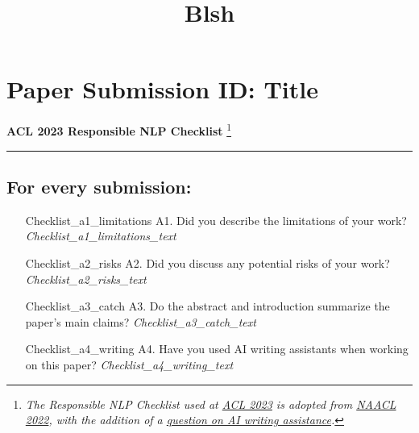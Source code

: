 \documentclass[11pt]{article}
\newcommand\blfootnote[1]{%
  \begingroup
  \renewcommand\thefootnote{}\footnote{#1}%
  \addtocounter{footnote}{-1}%
  \endgroup
}
\begin{document}
\appendix
\title{Blsh}
\section*{Paper {{Submission ID}}: {{Title}}}
\textbf{ACL 2023 Responsible NLP Checklist}
\blfootnote{\textit{The Responsible NLP Checklist used at \href{https://2023.aclweb.org/}{ACL 2023} is adopted from \href{https://2022.naacl.org/blog/responsible-nlp-research-checklist/}{NAACL 2022}, 
with the addition of a \href{https://2023.aclweb.org/blog/ACL-2023-policy/}{question on AI writing assistance}.}} 
\hrule

\renewcommand{\thesubsection}{\Alph{subsection}}

\subsection{For every submission:}
\begin{itemize}
    \item[{{Checklist_a1_limitations}}] A1. Did you describe the limitations of your work?
    \newline\textit{{{Checklist_a1_limitations_text}}}
    \item[{{Checklist_a2_risks}}] A2. Did you discuss any potential risks of your work?
    \newline\textit{{{Checklist_a2_risks_text}}}
    \item[{{Checklist_a3_catch}}] A3. Do the abstract and introduction summarize the paper's main claims?
    \newline\textit{{{Checklist_a3_catch_text}}}
    \item[{{Checklist_a4_writing}}] A4. Have you used AI writing assistants when working on this paper?
    \newline\textit{{{Checklist_a4_writing_text}}}
\end{itemize}

\end{document}
